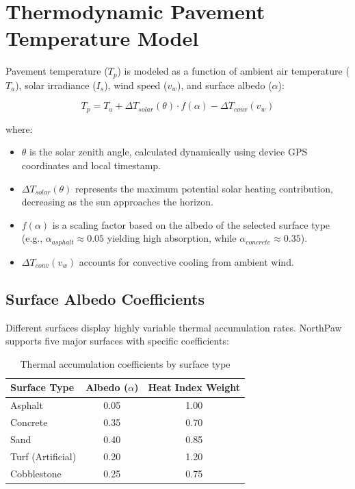 \documentclass[11pt,twocolumn]{article}
\begin{document}
\section{Thermodynamic Pavement Temperature Model}
Pavement temperature ($T_p$) is modeled as a function of ambient air temperature ($T_a$), solar irradiance ($I_s$), wind speed ($v_w$), and surface albedo ($\alpha$):

\begin{equation}
T_p = T_a + \Delta T_{solar}(\theta) \cdot f(\alpha) - \Delta T_{conv}(v_w)
\end{equation}

where:
\begin{itemize}
  \item $\theta$ is the solar zenith angle, calculated dynamically using device GPS coordinates and local timestamp.
  \item $\Delta T_{solar}(\theta)$ represents the maximum potential solar heating contribution, decreasing as the sun approaches the horizon.
  \item $f(\alpha)$ is a scaling factor based on the albedo of the selected surface type (e.g., $\alpha_{asphalt} \approx 0.05$ yielding high absorption, while $\alpha_{concrete} \approx 0.35$).
  \item $\Delta T_{conv}(v_w)$ accounts for convective cooling from ambient wind.
\end{itemize}

\subsection{Surface Albedo Coefficients}
Different surfaces display highly variable thermal accumulation rates. NorthPaw supports five major surfaces with specific coefficients:
\begin{table}[h]
\centering
\caption{Thermal accumulation coefficients by surface type}
\begin{tabular}{lcc}
\toprule
Surface Type & Albedo ($\alpha$) & Heat Index Weight \\
\midrule
Asphalt & 0.05 & 1.00 \\
Concrete & 0.35 & 0.70 \\
Sand & 0.40 & 0.85 \\
Turf (Artificial) & 0.20 & 1.20 \\
Cobblestone & 0.25 & 0.75 \\
\bottomrule
\end{tabular}
\end{table}
\end{document}
